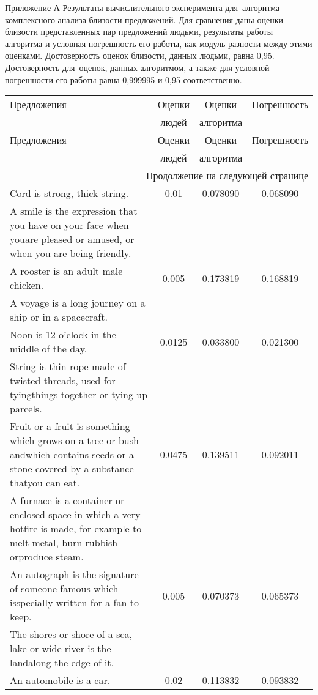 Приложение А
Результаты вычислительного эксперимента для~алгоритма комплексного анализа 
близости предложений.
Для сравнения даны оценки близости представленных пар предложений людьми, 
результаты работы алгоритма и условная погрешность его работы, как модуль разности между этими оценками.
Достоверность оценок близости, данных людьми, равна 0,95. Достоверность для~оценок,
данных алгоритмом, а также для условной погрешности его работы равна 0,999995 и 0,95 соответственно. 
\begin{center}
{\Large
\begin{longtable}{|p{9cm}|c|c|c|}
\hline
Предложения & Оценки & Оценки & Погрешность  \\
 & людей & алгоритма &  \\
\hline\endfirsthead
\hline
Предложения & Оценки & Оценки & Погрешность  \\
 & людей & алгоритма &  \\
\hline\endhead
\hline \multicolumn{4}{|r|}{{Продолжение на следующей странице}} \\ \hline
\endfoot
\endlastfoot
Cord is strong, thick string. & 0.01 & 0.078090 & 0.068090 \\
A smile is the expression that you have on your face when youare pleased or amused, or when you are being friendly. & & & \\
\hline
A rooster is an adult male chicken. & 0.005 & 0.173819 & 0.168819 \\
A voyage is a long journey on a ship or in a spacecraft. & & & \\
\hline
Noon is 12 o'clock in the middle of the day. & 0.0125 & 0.033800 & 0.021300 \\
String is thin rope made of twisted threads, used for tyingthings together or tying up parcels. & & & \\
\hline
Fruit or a fruit is something which grows on a tree or bush andwhich contains seeds or a stone covered by a substance thatyou can eat. & 0.0475 & 0.139511 & 0.092011 \\
A furnace is a container or enclosed space in which a very hotfire is made, for example to melt metal, burn rubbish orproduce steam. & & & \\
\hline
An autograph is the signature of someone famous which isspecially written for a fan to keep. & 0.005 & 0.070373 & 0.065373 \\
The shores or shore of a sea, lake or wide river is the landalong the edge of it. & & & \\
\hline
An automobile is a car. & 0.02 & 0.113832 & 0.093832 \\

\end{longtable}}
\end{center}

